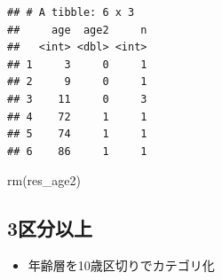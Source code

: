 \documentclass[
  xelatex,ja=standard, b5paper]{bxjsbook}
\newenvironment{Shaded}{\begin{snugshade}}{\end{snugshade}}
\newcommand{\FunctionTok}[1]{\textcolor[rgb]{0.00,0.00,0.00}{#1}}
\newcommand{\NormalTok}[1]{#1}
\providecommand{\tightlist}{%
  \setlength{\itemsep}{0pt}\setlength{\parskip}{0pt}}
\begin{document}
\begin{verbatim}
## # A tibble: 6 x 3
##     age  age2     n
##   <int> <dbl> <int>
## 1     3     0     1
## 2     9     0     1
## 3    11     0     3
## 4    72     1     1
## 5    74     1     1
## 6    86     1     1
\end{verbatim}

\begin{Shaded}
\begin{Highlighting}[]
\FunctionTok{rm}\NormalTok{(res\_age2)}
\end{Highlighting}
\end{Shaded}

\hypertarget{ux533aux5206ux4ee5ux4e0a}{%
\subsection{3区分以上}\label{ux533aux5206ux4ee5ux4e0a}}

\begin{itemize}
\tightlist
\item
  年齢層を10歳区切りでカテゴリ化
\end{itemize}
\end{document}
